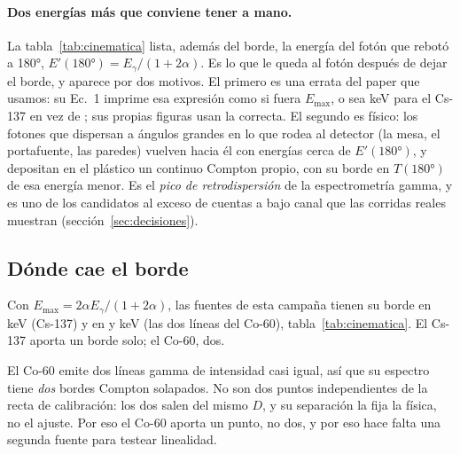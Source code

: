\documentclass[11pt,a4paper]{article}
\begin{document}
\begin{table}[htbp]
\centering
\caption{Las tres líneas de la campaña: $\alpha$, el borde Compton, qué
fracción de la energía del fotón es, la energía del fotón retrodispersado
(que es lo que la Ec.~1 del paper imprime por error como borde) y la del
fotón dispersado a 90°.}
\label{tab:cinematica}
\small

\end{table}

\paragraph{Dos energías más que conviene tener a mano.} La
tabla~\ref{tab:cinematica} lista, además del borde, la energía del fotón que
rebotó a 180°, $E'(180°) = E_\gamma/(1+2\alpha)$. Es lo que le queda al fotón
después de dejar el borde, y aparece por dos motivos. El primero es una
errata del paper que usamos: su Ec.~1 imprime esa expresión como si fuera
$E_{\max}$, o sea \EcUnoImpresaCs{} keV para el Cs-137 en vez de \BordeCs;
sus propias figuras usan la correcta. El segundo es físico: los fotones que
dispersan a ángulos grandes en lo que rodea al detector (la mesa, el
portafuente, las paredes) vuelven hacia él con energías cerca de
$E'(180°)$, y depositan en el plástico un continuo Compton propio, con su
borde en $T(180°)$ de esa energía menor. Es el \emph{pico de
retrodispersión} de la espectrometría gamma, y es uno de los candidatos al
exceso de cuentas a bajo canal que las corridas reales muestran
(sección~\ref{sec:decisiones}).

\subsection{Dónde cae el borde}

Con $E_{\max} = 2\alpha E_\gamma/(1+2\alpha)$, las fuentes de esta campaña
tienen su borde en \BordeCs{} keV (Cs-137) y en \BordeCoA{} y \BordeCoB{} keV
(las dos líneas del Co-60), tabla~\ref{tab:cinematica}. El Cs-137 aporta un
borde solo; el Co-60, dos.

\begin{aviso}
El Co-60 emite dos líneas gamma de intensidad casi igual, así que su espectro
tiene \emph{dos} bordes Compton solapados. No son dos puntos independientes de
la recta de calibración: los dos salen del mismo $D$, y su separación la fija
la física, no el ajuste. Por eso el Co-60 aporta un punto, no dos, y por eso
hace falta una segunda fuente para testear linealidad.
\end{aviso}
\end{document}
